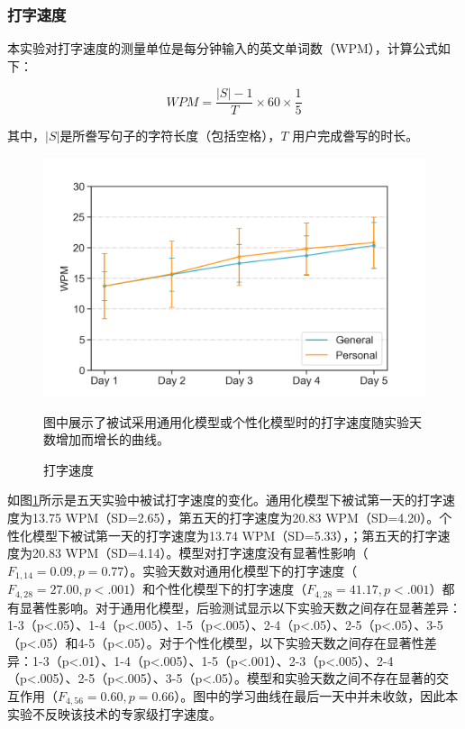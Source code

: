 \subsubsection{打字速度}

本实验对打字速度的测量单位是每分钟输入的英文单词数（WPM）\cite{arif2009analysis}，计算公式如下：

\begin{equation}
	WPM = \frac{|S|-1}{T} \times 60 \times \frac{1}{5}
\end{equation}

其中，$|S|$是所誊写句子的字符长度（包括空格），$T$ 用户完成誊写的时长。

\begin{figure}[!htbp]
	\centering
	\includegraphics[width=0.8\linewidth]{figures/QwertyRing_wpm.png}
	\caption*{图中展示了被试采用通用化模型或个性化模型时的打字速度随实验天数增加而增长的曲线。}
	\caption{打字速度}
	\label{fig:QwertyRing_wpm}
\end{figure}

如图\ref{fig:QwertyRing_wpm}所示是五天实验中被试打字速度的变化。通用化模型下被试第一天的打字速度为13.75 WPM（SD=2.65），第五天的打字速度为20.83 WPM（SD=4.20）。个性化模型下被试第一天的打字速度为13.74 WPM（SD=5.33），；第五天的打字速度为20.83 WPM（SD=4.14）。模型对打字速度没有显著性影响（$F_{1,14}=0.09,p=0.77$）。实验天数对通用化模型下的打字速度（$F_{4,28}=27.00,p<.001$）和个性化模型下的打字速度（$F_{4,28}=41.17,p<.001$）都有显著性影响。对于通用化模型，后验测试显示以下实验天数之间存在显著差异：1-3（p<.05）、1-4（p<.005）、1-5（p<.005）、2-4（p<.05）、2-5（p<.05）、3-5（p<.05）和4-5（p<.05）。对于个性化模型，以下实验天数之间存在显著性差异：1-3（p<.01）、1-4（p<.005）、1-5（p<.001）、2-3（p<.005）、2-4（p<.005）、2-5（p<.005）、3-5（p<.05）。模型和实验天数之间不存在显著的交互作用（$F_{4,56}=0.60,p=0.66$）。图中的学习曲线在最后一天中并未收敛，因此本实验不反映该技术的专家级打字速度。


